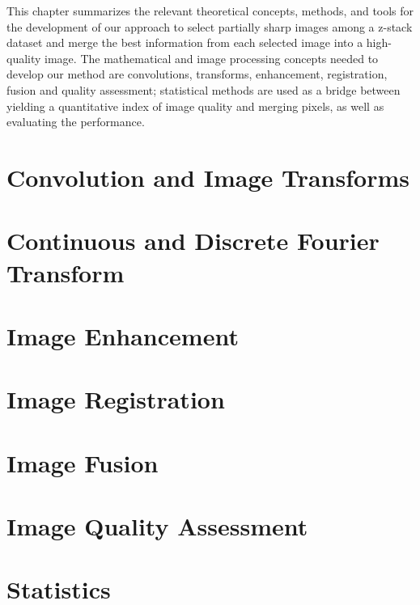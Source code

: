
This chapter summarizes the relevant theoretical concepts, methods, and tools for the development of our approach to select partially sharp images among a z-stack dataset and merge the best information from each selected image into a high-quality image. The mathematical and image processing concepts needed to develop our method are convolutions, transforms, enhancement, registration, fusion and quality assessment; statistical methods are used as a bridge between yielding a quantitative index of image quality and merging pixels, as well as evaluating the performance. 

\section{Convolution and Image Transforms}


\section{Continuous and Discrete Fourier Transform}


\section{Image Enhancement}


\section{Image Registration}


\section{Image Fusion}


\section{Image Quality Assessment}


\section{Statistics}
